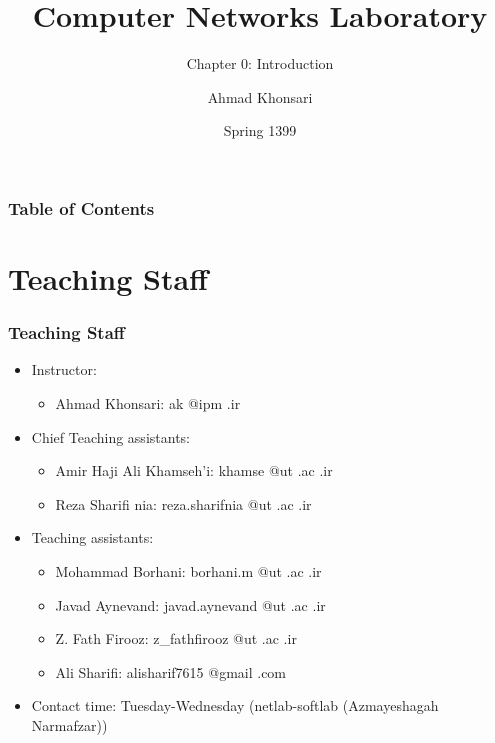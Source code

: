 \documentclass[aspectratio=169,15pt]{beamer}
\title{Computer Networks Laboratory}
\subtitle{Chapter 0: Introduction}
\author{Ahmad Khonsari}
\institute[ECE @ UT]{
    Electrical and Computer Engineering Department\\
    Tehran University \newline
    \url{http://ece.ut.ac.ir/portal/}
}
\date{Spring 1399}
\begin{document}
\frame{\titlepage}


\begin{frame}
    \frametitle{Table of Contents}
    \tableofcontents
\end{frame}

\section{Teaching Staff}
\begin{frame}
\frametitle{Teaching Staff}
\begin{itemize}
    \item Instructor:
    \begin{itemize}
        \item Ahmad Khonsari: \alert{ak @ipm .ir}
    \end{itemize}
    \item Chief Teaching assistants:
    \begin{itemize}
        \item Amir Haji Ali Khamseh’i: \alert{khamse @ut .ac .ir}
        \item Reza Sharifi nia: \alert{reza.sharifnia @ut .ac .ir}
    \end{itemize}
    \item Teaching assistants:
    \begin{itemize}
        \item Mohammad Borhani: \alert{borhani.m @ut .ac .ir}
        \item Javad Aynevand: \alert{javad.aynevand @ut .ac .ir}
        \item Z. Fath Firooz: \alert{z\_fathfirooz @ut .ac .ir}
        \item Ali Sharifi: \alert{alisharif7615 @gmail .com}
    \end{itemize}
    \item Contact time: Tuesday-Wednesday (netlab-softlab (Azmayeshagah Narmafzar))
\end{itemize}

\end{frame}
\end{document}

